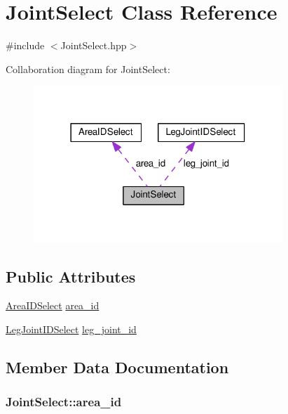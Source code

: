 \hypertarget{classJointSelect}{}\section{Joint\+Select Class Reference}
\label{classJointSelect}


{\ttfamily \#include $<$Joint\+Select.\+hpp$>$}



Collaboration diagram for Joint\+Select\+:\nopagebreak
\begin{figure}[H]
\begin{center}
\leavevmode
\includegraphics[width=266pt]{classJointSelect__coll__graph}
\end{center}
\end{figure}
\subsection*{Public Attributes}
\begin{DoxyCompactItemize}
\item 
\hyperlink{classAreaIDSelect}{Area\+I\+D\+Select} \hyperlink{classJointSelect_a03dadee9f8fdfb14e481ea7dfb8def4b}{area\+\_\+id}
\item 
\hyperlink{classLegJointIDSelect}{Leg\+Joint\+I\+D\+Select} \hyperlink{classJointSelect_a623cd710b2030358e8c63417e9c01ead}{leg\+\_\+joint\+\_\+id}
\end{DoxyCompactItemize}


\subsection{Member Data Documentation}
\subsubsection[{\texorpdfstring{area\+\_\+id}{area_id}}]{ Joint\+Select\+::area\+\_\+id}\hypertarget{classJointSelect_a03dadee9f8fdfb14e481ea7dfb8def4b}{}\label{classJointSelect_a03dadee9f8fdfb14e481ea7dfb8def4b}
